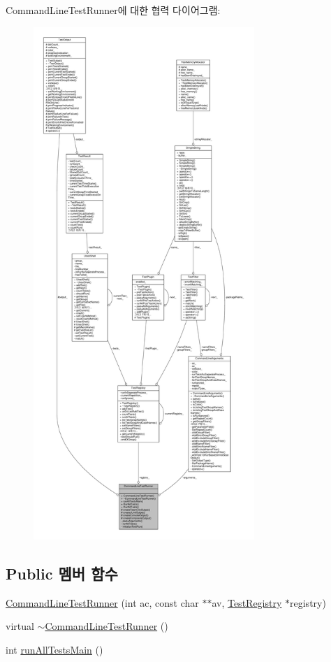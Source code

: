 Command\+Line\+Test\+Runner에 대한 협력 다이어그램\+:
\nopagebreak
\begin{figure}[H]
\begin{center}
\leavevmode
\includegraphics[height=550pt]{class_command_line_test_runner__coll__graph}
\end{center}
\end{figure}
\subsection*{Public 멤버 함수}
\begin{DoxyCompactItemize}
\item 
\hyperlink{class_command_line_test_runner_aeac1d046e8c90b2dcee313109c6ff6b3}{Command\+Line\+Test\+Runner} (int ac, const char $\ast$$\ast$av, \hyperlink{class_test_registry}{Test\+Registry} $\ast$registry)
\item 
virtual \hyperlink{class_command_line_test_runner_afaf7aca585974a6db7863ed762398872}{$\sim$\+Command\+Line\+Test\+Runner} ()
\item 
int \hyperlink{class_command_line_test_runner_ae2d295539b64a4d4ea8649fb193c917e}{run\+All\+Tests\+Main} ()
\end{DoxyCompactItemize}
